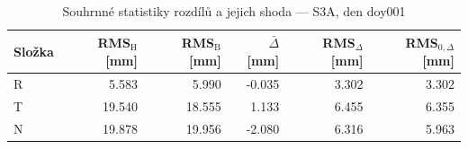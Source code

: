 \begin{table}[H]
\centering
\caption{Souhrnné statistiky rozdílů a jejich shoda — S3A, den doy001}
\label{tab:hermite_vs_bernese_s3a_doy001_summary}
\begin{tabular}{lrrrrr}
\toprule
Složka & RMS$_\mathrm{H}$ [mm] & RMS$_\mathrm{B}$ [mm] & $\bar{\Delta}$ [mm] & RMS$_{\Delta}$ [mm] & RMS$_{0,\Delta}$ [mm] \\
\midrule
R & 5.583 & 5.990 & -0.035 & 3.302 & 3.302 \\
T & 19.540 & 18.555 & 1.133 & 6.455 & 6.355 \\
N & 19.878 & 19.956 & -2.080 & 6.316 & 5.963 \\
\bottomrule
\end{tabular}
\end{table}
